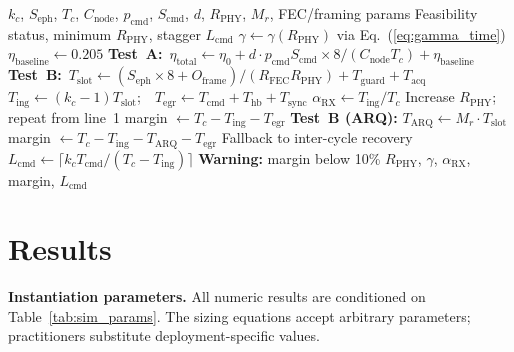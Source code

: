 \documentclass[journal]{IEEEtran}
\begin{document}
\begin{algorithm}[t]
\caption{Coordination Feasibility Test}
\label{alg:feasibility}
\begin{algorithmic}[1]
\REQUIRE $k_c$, $S_{\text{eph}}$, $T_c$, $C_{\text{node}}$, $p_{\text{cmd}}$, $S_{\text{cmd}}$, $d$, $R_{\text{PHY}}$, $M_r$, FEC/framing params
\ENSURE Feasibility status, minimum $R_{\text{PHY}}$, stagger $L_{\text{cmd}}$
\STATE $\gamma \leftarrow \gamma(R_{\text{PHY}})$ via Eq.~(\ref{eq:gamma_time})
\STATE $\eta_{\text{baseline}} \leftarrow 0.205$
\STATE \textbf{Test~A:}~$\eta_{\text{total}} \leftarrow \eta_0 + d \cdot p_{\text{cmd}} S_{\text{cmd}} \times 8 / (C_{\text{node}} T_c) + \eta_{\text{baseline}}$
\STATE \textbf{Test~B:}~$T_{\text{slot}} \leftarrow (S_{\text{eph}} \times 8 + O_{\text{frame}}) / (R_{\text{FEC}} R_{\text{PHY}}) + T_{\text{guard}} + T_{\text{acq}}$
\STATE $T_{\text{ing}} \leftarrow (k_c - 1) T_{\text{slot}}$;~~$T_{\text{egr}} \leftarrow T_{\text{cmd}} + T_{\text{hb}} + T_{\text{sync}}$
\STATE $\alpha_{\text{RX}} \leftarrow T_{\text{ing}} / T_c$
    \STATE Increase $R_{\text{PHY}}$; repeat from line~1
\ENDIF
\STATE margin $\leftarrow T_c - T_{\text{ing}} - T_{\text{egr}}$
\STATE \textbf{Test~B (ARQ):} $T_{\text{ARQ}} \leftarrow M_r \cdot T_{\text{slot}}$
    \STATE margin $\leftarrow T_c - T_{\text{ing}} - T_{\text{ARQ}} - T_{\text{egr}}$
    \STATE Fallback to inter-cycle recovery
\ENDIF
\STATE $L_{\text{cmd}} \leftarrow \lceil k_c T_{\text{cmd}} / (T_c - T_{\text{ing}}) \rceil$
    \STATE \textbf{Warning:} margin below 10\%
\ENDIF
\RETURN $R_{\text{PHY}}$, $\gamma$, $\alpha_{\text{RX}}$, margin, $L_{\text{cmd}}$
\end{algorithmic}
\end{algorithm}

\section{Results}

\textbf{Instantiation parameters.} All numeric results are conditioned on Table~\ref{tab:sim_params}. The sizing equations accept arbitrary parameters; practitioners substitute deployment-specific values.
\end{document}
